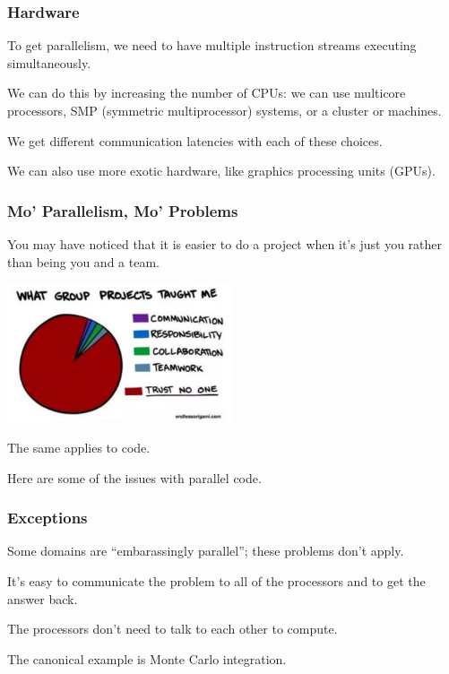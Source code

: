 \begin{frame}
\frametitle{Hardware}

To get parallelism, we need to have multiple instruction
streams executing simultaneously. 

We can do this by increasing the
number of CPUs: we can use multicore processors, SMP (symmetric
multiprocessor) systems, or a cluster or machines. 

We get different
communication latencies with each of these choices.

We can also use more exotic hardware, like graphics processing units
(GPUs).

\end{frame}



\begin{frame}
\frametitle{Mo' Parallelism, Mo' Problems}
You may have noticed that it is easier to do a project when it's just
you rather than being you and a team. 

\begin{center}
	\includegraphics[width=0.5\textwidth]{images/group-projects.jpg}
\end{center}

The same applies to code.

Here are some of the issues with parallel code.


\end{frame}



\begin{frame}
\frametitle{Exceptions}

Some domains are ``embarassingly parallel''; these problems
don't apply. 

It's easy to communicate the problem to all of the processors and to get the answer back.
 
The processors don't need to talk to each other to compute. 

The canonical
example is Monte Carlo integration.


\end{frame}



